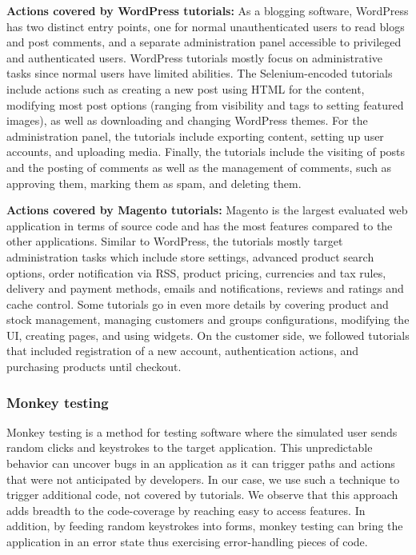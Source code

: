 \vspace{0.5ex}

\noindent \textbf{Actions covered by WordPress tutorials:} As a blogging software, WordPress has two distinct entry points, one for normal unauthenticated users to read blogs and post comments, and a separate administration panel accessible to privileged and authenticated users.
WordPress tutorials mostly focus on administrative tasks since normal users have limited abilities. The Selenium-encoded tutorials include actions such as creating a new post using HTML for the content, modifying most post options (ranging from visibility and tags to setting featured images), as well as downloading and changing WordPress themes.
For the administration panel, the tutorials include exporting content, setting up user accounts, and uploading media. Finally, the tutorials include the visiting of posts and the posting of comments as well as the management of comments, such as approving them, marking them as spam, and deleting them.
\vspace{0.5ex}

\noindent \textbf{Actions covered by Magento tutorials:} Magento is the largest evaluated web application in terms of source code and has the most features compared to the other applications. Similar to WordPress, the tutorials mostly target administration tasks which include store settings, advanced product search options, order notification via RSS, product pricing, currencies and tax rules, delivery and payment methods, emails and notifications, reviews and ratings and cache control. Some tutorials go in even more details by covering product and stock management, managing customers and groups configurations, modifying the UI, creating pages, and using widgets.
On the customer side, we followed tutorials that included registration of a new account, authentication actions, and purchasing products until checkout.






\subsubsection{Monkey testing}
\label{sec:monkey}
Monkey testing is a method for testing
software where the simulated user sends random clicks and keystrokes to the
target application. This unpredictable behavior can uncover bugs in an
application as it can trigger paths and actions that were not anticipated by
developers. In our case, we use such a technique to trigger additional code,
not covered by tutorials. We observe that this approach adds breadth to the
code-coverage by reaching easy to access features. In addition, by feeding
random keystrokes into forms, monkey testing can bring the application in an
error state thus exercising error-handling pieces of code.

